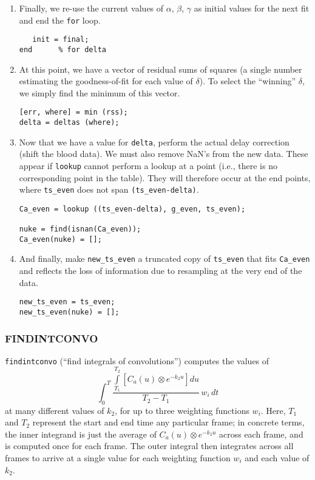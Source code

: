 \documentclass[12pt]{article}
\def\code#1{{\tt #1}}
\begin{document}
\begin{enumerate}
\item Finally, we re-use the current values of $\alpha$, $\beta$,
  $\gamma$ as initial values for the next fit and end the \code{for} loop.
\begin{verbatim}
   init = final;
end      % for delta
\end{verbatim}

\item At this point, we have a vector of residual sums of squares (a single
  number estimating the goodness-of-fit for each value of $\delta$).
  To select the ``winning'' $\delta$, we simply find the minimum of
  this vector.
\begin{verbatim}
[err, where] = min (rss);
delta = deltas (where);
\end{verbatim}

\item Now that we have a value for \code{delta}, perform the actual
delay correction (shift the blood data).  We must also remove NaN's
from the new data.  These appear if \code{lookup} cannot perform a
lookup at a point (i.e., there is no corresponding point in the table).
They will therefore occur at the end points, where \code{ts\_even}
does not span \code{(ts\_even-delta)}.
\begin{verbatim}
Ca_even = lookup ((ts_even-delta), g_even, ts_even);

nuke = find(isnan(Ca_even));
Ca_even(nuke) = [];
\end{verbatim}

\item And finally, make \code{new\_ts\_even} a truncated copy of
  \code{ts\_even} that fits \code{Ca\_even} and reflects the loss of
  information due to resampling at the very end of the data.
\begin{verbatim}
new_ts_even = ts_even;
new_ts_even(nuke) = [];
\end{verbatim}
\end{enumerate}


\subsubsection{FINDINTCONVO}
\label{sec:findintconvo_listing}

\code{findintconvo} (``find integrals of convolutions'') computes the
values of
\begin{equation}
\label{eq:conv_int}
  \int_{0}^{T} \frac{\int\limits_{T_1}^{T_2}
    \left[ C_{a}(u) \otimes e^{-k_{2}u} \right] du}{T_2 - T_1} \, w_i \, dt
\end{equation}
at many different values of $k_2$, for up to three weighting functions
$w_i$.  Here, $T_1$ and $T_2$ represent the start and end time any
particular frame; in concrete terms, the inner integrand is just the
average of $C_{a}(u) \otimes e^{-k_{2}u}$ across each frame, and is
computed once for each frame.  The outer integral then integrates across
all frames to arrive at a single value for each weighting function
$w_i$ and each value of $k_2$.
\end{document}
